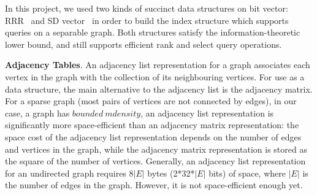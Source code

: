 \documentclass[12pt,glossary]{dalthesis}
\begin{document}
In this project, we used two kinds of succinct data structures on bit vector: RRR~\cite{RRR} and SD vector~\cite{SD-vector} in order to build the index structure which supports queries on a separable graph. Both structures satisfy the information-theoretic lower bound, and still supports efficient rank and select query operations.

\bigskip
\bigskip

\textbf{Adjacency Tables}. An adjacency list representation for a graph associates each vertex in the graph with the collection of its neighbouring vertices. For use as a data structure, the main alternative to the adjacency list is the adjacency matrix. For a sparse graph (most pairs of vertices are not connected by edges), in our case, a graph has $bounded \ mdensity$, an adjacency list representation is significantly more space-efficient than an adjacency matrix representation: the space cost of the adjacency list representation depends on the number of edges and vertices in the graph, while the adjacency matrix representation is stored as the square of the number of vertices. Generally, an adjacency list representation for an undirected graph requires 8$|E|$ bytes (2*32*$|E|$ bits) of space, where $|E|$ is the number of edges in the graph. However, it is not space-efficient enough yet.

\bigskip
\bigskip
\end{document}
